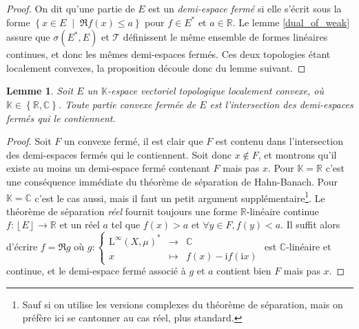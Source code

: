\documentclass[a4paper,12pt]{article}
\newtheorem{lemma}[theorem]{Lemme}
\renewcommand{\i}{\mathrm{i}}
\newcommand{\R}{\mathbb{R}}
\newcommand{\C}{\mathbb{C}}
\newcommand{\K}{\mathbb{K}}
\newcommand{\floor}[1]{\left\lfloor #1 \right\rfloor}
\newcommand{\set}[1]{\left\{ #1 \right\}}
\newcommand\fundef[3]{#1: \left\{\begin{array}{ccc}#2\\#3\end{array}\right.}
\newcommand{\tq}{\;\middle|\;}
\begin{document}
\begin{proof}
    On dit qu'une partie de $E$ est un \emph{demi-espace fermé} si elle s'écrit sous la forme $\set{x\in E\tq \Re f(x)\leq a}$ pour 
    $f\in E^*$ et $a\in\R$.
    Le lemme \ref{dual_of_weak} assure que $\sigma(E^*, E)$ et $\mathcal{T}$ définissent le même ensemble de formes linéaires continues,
    et donc les mêmes demi-espaces fermés. Ces deux topologies étant localement convexes, la proposition découle donc du lemme suivant.
\end{proof}

\begin{lemma}
    Soit $E$ un $\K$-espace vectoriel topologique localement convexe, où $\K\in\set{\R, \C}$. Toute partie 
    convexe fermée de $E$ est l'intersection des demi-espaces fermés qui le contiennent.
\end{lemma}

\begin{proof}
    Soit $F$ un convexe fermé, il est clair que $F$ est contenu dans l'intersection des demi-espaces fermés qui le contiennent.
    Soit donc $x\notin F$, et montrons qu'il existe au moins un demi-espace fermé contenant $F$ mais pas $x$. 
    Pour $\K=\R$ c'est une conséquence immédiate du théorème de séparation de Hahn-Banach. Pour $\K=\C$
    c'est le cas aussi, mais il faut un petit argument supplémentaire\footnote{Sauf si on utilise les versions complexes 
    du théorème de séparation, mais on préfère ici se cantonner au cas réel, plus standard.}. Le théorème 
    de séparation \emph{réel} fournit toujours une forme $\R$-linéaire continue $f:\floor{E}\to\R$ et un réel $a$ tel que $f(x)>a$
    et $\forall y\in F, f(y)<a$. Il suffit alors d'écrire $f = \Re g$ où $\fundef{g}{\mathrm{L}^\infty(X,\mu)^* &\to& \C}{x&\mapsto&f(x)-\i f(\i x)}$ est $\C$-linéaire et continue,
    et le demi-espace fermé associé à $g$ et $a$ contient bien $F$ mais pas $x$. 
\end{proof}
\end{document}
